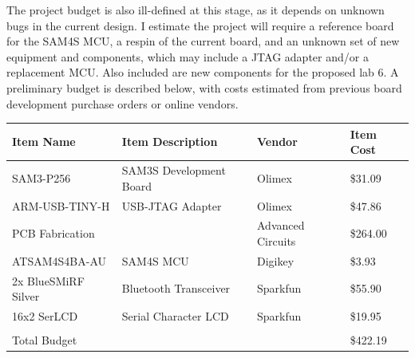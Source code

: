 \documentclass[12pt]{article}
\begin{document}
The project budget is also ill-defined at this stage, as it depends on unknown bugs in the current design. I estimate the project will require a reference board for the SAM4S MCU, a respin of the current board, and an unknown set of new equipment and components, which may include a JTAG adapter and/or a replacement MCU. Also included are new components for the proposed lab 6. A preliminary budget is described below, with costs estimated from previous board development purchase orders or online vendors.

\begin{center}
	\begin{tabular}{llll}
	Item Name & Item Description & Vendor & Item Cost \\
	\hline
	SAM3-P256 & SAM3S Development Board & Olimex & \$31.09 \\
	ARM-USB-TINY-H & USB-JTAG Adapter & Olimex & \$47.86 \\
	PCB Fabrication &  & Advanced Circuits & \$264.00 \\
	ATSAM4S4BA-AU & SAM4S MCU & Digikey & \$3.93 \\
	2x BlueSMiRF Silver & Bluetooth Transceiver & Sparkfun & \$55.90 \\
	16x2 SerLCD & Serial Character LCD & Sparkfun & \$19.95 \\
	& & & \\
	Total Budget & & & \$422.19
	\end{tabular}

\end{center}


	
\end{document}
